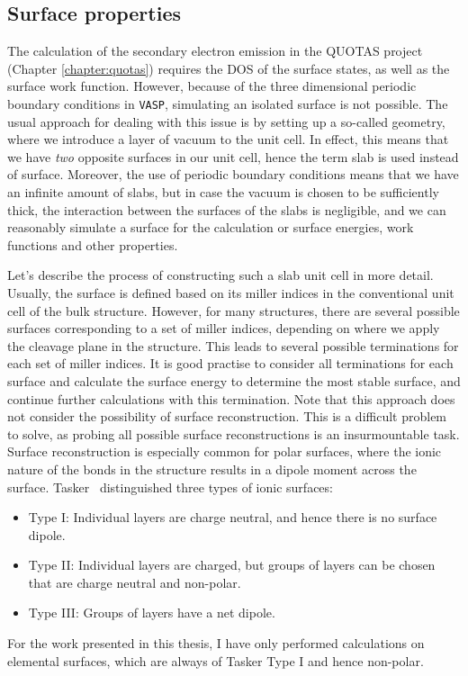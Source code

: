 \begin{refsection}
\subsection{Surface properties}\label{automation:sec-surface} 
 
The calculation of the secondary electron emission in the QUOTAS project 
(Chapter \ref{chapter:quotas}) requires the DOS of the surface states, as well 
as the surface work function. However, because of the three dimensional 
periodic boundary conditions in \texttt{VASP}, simulating an isolated surface 
is not possible. The usual approach for dealing with this issue is by setting 
up a so-called  geometry, where we introduce a layer of vacuum to 
the unit cell. In effect, this means that we have \textit{two} opposite 
surfaces in our unit cell, hence the term slab is used instead of surface. 
Moreover, the use of periodic boundary conditions means that we have an 
infinite amount of slabs, but in case the vacuum is chosen to be sufficiently 
thick, the interaction between the surfaces of the slabs is negligible, and we 
can reasonably simulate a surface for the calculation or surface energies, 
work functions and other properties.  
 
Let's describe the process of constructing such a slab unit cell in more 
detail. Usually, the surface is defined based on its miller indices in the 
conventional unit cell of the bulk structure. However, for many structures, 
there are several possible surfaces corresponding to a set of miller indices, 
depending on where we apply the cleavage plane in the structure. This leads to 
several possible terminations for each set of miller indices. It is good 
practise to consider all terminations for each surface and calculate the 
surface energy to determine the most stable surface, and continue further 
calculations with this termination. Note that this approach does not consider 
the possibility of surface reconstruction. This is a difficult problem to 
solve, as probing all possible surface reconstructions is an insurmountable 
task. Surface reconstruction is especially common for polar surfaces, where 
the ionic nature of the bonds in the structure results in a dipole 
moment across the surface. Tasker~\cite{Tasker1979} distinguished three types 
of ionic surfaces: 
\begin{itemize} 
\item Type I: Individual layers are charge neutral, and hence there is no 
surface dipole. 
\item Type II: Individual layers are charged, but groups of layers can be 
chosen that are charge neutral and non-polar. 
\item Type III: Groups of layers have a net dipole. 
\end{itemize} 
For the work presented in this thesis, I have only performed calculations on 
elemental surfaces, which are always of Tasker Type I and hence non-polar. 
 

\end{refsection}
